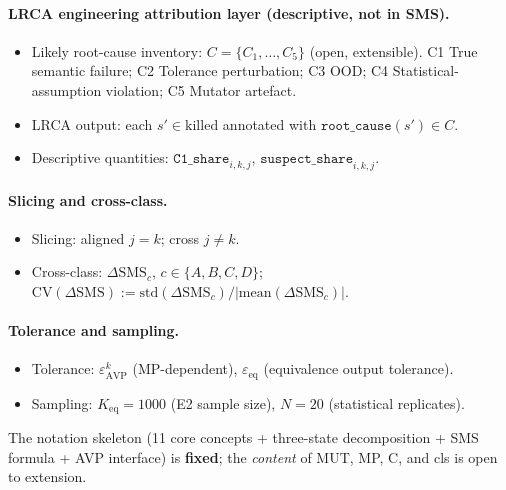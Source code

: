 \documentclass[manuscript,screen,review]{acmart}
\begin{document}
\paragraph{LRCA engineering attribution layer (descriptive, not in SMS).}
\begin{itemize}
\item Likely root-cause inventory: $C = \{C_1, \ldots, C_5\}$ (open, extensible). C1 True semantic failure; C2 Tolerance perturbation; C3 OOD; C4 Statistical-assumption violation; C5 Mutator artefact.
\item LRCA output: each $s' \in \mathrm{killed}$ annotated with $\texttt{root\_cause}(s') \in C$.
\item Descriptive quantities: $\texttt{C1\_share}_{i,k,j}$, $\texttt{suspect\_share}_{i,k,j}$.
\end{itemize}

\paragraph{Slicing and cross-class.}
\begin{itemize}
\item Slicing: aligned $j = k$; cross $j \neq k$.
\item Cross-class: $\Delta\mathrm{SMS}_c$, $c \in \{A, B, C, D\}$; $\mathrm{CV}(\Delta\mathrm{SMS}) := \mathrm{std}(\Delta\mathrm{SMS}_c) / |\mathrm{mean}(\Delta\mathrm{SMS}_c)|$.
\end{itemize}

\paragraph{Tolerance and sampling.}
\begin{itemize}
\item Tolerance: $\varepsilon_{\mathrm{AVP}}^k$ (MP-dependent), $\varepsilon_{\mathrm{eq}}$ (equivalence output tolerance).
\item Sampling: $K_{\mathrm{eq}} = 1000$ (E2 sample size), $N = 20$ (statistical replicates).
\end{itemize}

The notation skeleton (11 core concepts + three-state decomposition +
SMS formula + AVP interface) is \textbf{fixed}; the \emph{content} of
MUT, MP, C, and cls is open to extension.
\end{document}
